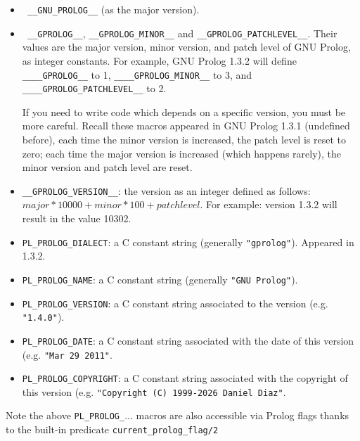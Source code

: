 \begin{itemize}

\item \texttt{ \_\_GNU\_PROLOG\_\_} (as the major version).

\item \texttt{ \_\_GPROLOG\_\_}, \texttt{\_\_GPROLOG\_MINOR\_\_} and
  \texttt{\_\_GPROLOG\_PATCHLEVEL\_\_}. Their values are the major version,
  minor version, and patch level of GNU Prolog, as integer constants. For
  example, GNU Prolog 1.3.2 will define \texttt{\_\_\_\_GPROLOG\_\_} to 1,
  \texttt{\_\_\_\_GPROLOG\_MINOR\_\_} to 3, and
  \texttt{\_\_\_\_GPROLOG\_PATCHLEVEL\_\_} to 2.

  If you need to write code which depends on a specific version, you must be
  more careful. Recall these macros appeared in GNU Prolog 1.3.1 (undefined
  before), each time the minor version is increased, the patch level is reset
  to zero; each time the major version is increased (which happens rarely),
  the minor version and patch level are reset.

\item \texttt{\_\_GPROLOG\_VERSION\_\_}: the version as an integer defined as
  follows: $major * 10000 + minor * 100 + patch level$. For example: version
  1.3.2 will result in the value 10302.

\item \texttt{PL\_PROLOG\_DIALECT}: a C constant string (generally
  \texttt{"gprolog"}). Appeared in 1.3.2.

\item \texttt{PL\_PROLOG\_NAME}: a C constant string (generally
  \texttt{"GNU Prolog"}).

\item \texttt{PL\_PROLOG\_VERSION}: a C constant string associated to the
  version (e.g. \texttt{"1.4.0"}).

\item \texttt{PL\_PROLOG\_DATE}: a C constant string associated with the date
  of this version (e.g. \texttt{"Mar 29 2011"}.

\item \texttt{PL\_PROLOG\_COPYRIGHT}: a C constant string associated with the
  copyright of this version (e.g. \texttt{"Copyright (C) 1999-2026 Daniel Diaz"}.

\end{itemize}

Note the above \texttt{PL\_PROLOG\_}... macros are also accessible via Prolog
flags thanks to the built-in predicate \texttt{current\_prolog\_flag/2}


